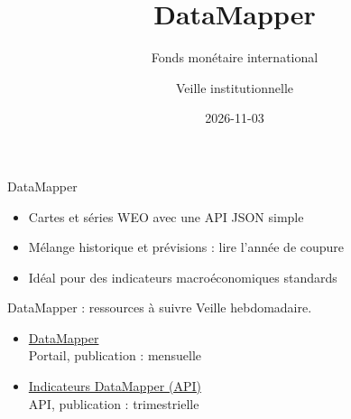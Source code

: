 \documentclass[aspectratio=169,11pt]{beamer}
\title{DataMapper}
\subtitle{Fonds monétaire international}
\author{Veille institutionnelle}
\date{2026-11-03}
\begin{document}
\begin{frame}\titlepage\end{frame}

\begin{frame}{DataMapper}
\begin{itemize}
\item Cartes et séries WEO avec une API JSON simple
\item Mélange historique et prévisions : lire l'année de coupure
\item Idéal pour des indicateurs macroéconomiques standards
\end{itemize}
\end{frame}

\begin{frame}{DataMapper : ressources à suivre}
\small
Veille hebdomadaire.
\begin{itemize}
\item \href{https://www.imf.org/external/datamapper}{DataMapper}\\{\footnotesize Portail, publication : mensuelle}
\item \href{https://www.imf.org/external/datamapper/api/v1/indicators}{Indicateurs DataMapper (API)}\\{\footnotesize API, publication : trimestrielle}
\end{itemize}
\end{frame}
\end{document}
